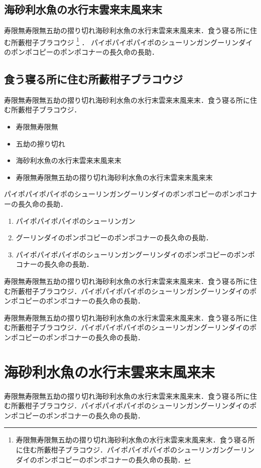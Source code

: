 \documentclass[a4j, 12Q, twocolumn, twoside]{jsarticle}
\begin{document}
\subsection{海砂利水魚の水行末雲来末風来末}
寿限無寿限無五劫の摺り切れ海砂利水魚の水行末雲来末風来末．食う寝る所に住む所藪柑子ブラコウジ
\footnote{寿限無寿限無五劫の摺り切れ海砂利水魚の水行末雲来末風来末．食う寝る所に住む所藪柑子ブラコウジ．パイポパイポパイポのシューリンガングーリンダイのポンポコピーのポンポコナーの長久命の長助．}
．
パイポパイポパイポのシューリンガングーリンダイのポンポコピーのポンポコナーの長久命の長助．
\subsection{食う寝る所に住む所藪柑子ブラコウジ}
寿限無寿限無五劫の摺り切れ海砂利水魚の水行末雲来末風来末．食う寝る所に住む所藪柑子ブラコウジ．
\begin{itemize}
  \item 寿限無寿限無 
  \item 五劫の擦り切れ
  \item 海砂利水魚の水行末雲来末風来末
  \item 寿限無寿限無五劫の摺り切れ海砂利水魚の水行末雲来末風来末
\end{itemize}
%
パイポパイポパイポのシューリンガングーリンダイのポンポコピーのポンポコナーの長久命の長助．
\begin{enumerate}
  \item パイポパイポパイポのシューリンガン
  \item グーリンダイのポンポコピーのポンポコナーの長久命の長助．
  \item パイポパイポパイポのシューリンガングーリンダイのポンポコピーのポンポコナーの長久命の長助．
\end{enumerate}
%
寿限無寿限無五劫の摺り切れ海砂利水魚の水行末雲来末風来末．食う寝る所に住む所藪柑子ブラコウジ．パイポパイポパイポのシューリンガングーリンダイのポンポコピーのポンポコナーの長久命の長助．

寿限無寿限無五劫の摺り切れ海砂利水魚の水行末雲来末風来末．食う寝る所に住む所藪柑子ブラコウジ．パイポパイポパイポのシューリンガングーリンダイのポンポコピーのポンポコナーの長久命の長助．

\section{海砂利水魚の水行末雲来末風来末}
寿限無寿限無五劫の摺り切れ海砂利水魚の水行末雲来末風来末．食う寝る所に住む所藪柑子ブラコウジ．パイポパイポパイポのシューリンガングーリンダイのポンポコピーのポンポコナーの長久命の長助．
\end{document}
